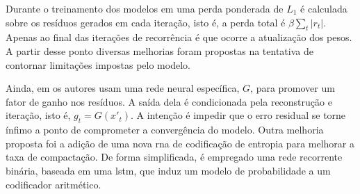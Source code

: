

Durante o treinamento dos modelos em \cite{FullResolution2017Toderici} uma perda ponderada de $L_1$ é calculada sobre os resíduos gerados em cada iteração, isto é, a perda total é $\beta \sum_t|r_t|$. Apenas ao final das iterações de recorrência é que ocorre a atualização dos pesos. A partir desse ponto diversas melhorias foram propostas na tentativa de contornar limitações impostas pelo modelo.


Ainda, em \cite{FullResolution2017Toderici} os autores usam uma rede neural específica, $G$,  para promover um fator de ganho nos resíduos. A saída dela é condicionada pela reconstrução e iteração, isto é, $g_t = G(x'_t)$. A intenção é impedir que o erro residual se torne ínfimo a ponto de comprometer a convergência do modelo. 
Outra melhoria proposta foi a adição de uma nova \acrshort{rna} de codificação de entropia para melhorar a taxa de compactação. De forma simplificada, é empregado uma rede recorrente binária, baseada em uma \acrshort{lstm}, que induz um modelo de probabilidade a um codificador aritmético.







